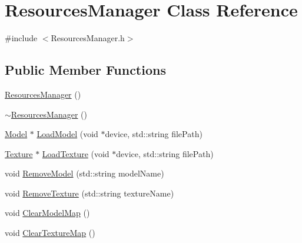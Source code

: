 \hypertarget{class_resources_manager}{\section{Resources\-Manager Class Reference}
\label{class_resources_manager}
}


{\ttfamily \#include $<$Resources\-Manager.\-h$>$}

\subsection*{Public Member Functions}
\begin{DoxyCompactItemize}
\item 
\hyperlink{class_resources_manager_a7fe5ff24c1df6a60214bea3ca474d155}{Resources\-Manager} ()
\item 
\hyperlink{class_resources_manager_aa345cbcc786096e2bb918f2f1139d567}{$\sim$\-Resources\-Manager} ()
\item 
\hyperlink{class_model}{Model} $\ast$ \hyperlink{class_resources_manager_a66fc2968d1be10a45d725faacc931ce1}{Load\-Model} (void $\ast$device, std\-::string file\-Path)
\item 
\hyperlink{class_texture}{Texture} $\ast$ \hyperlink{class_resources_manager_a9be3c24cbfb024a07a91dbd50d9da602}{Load\-Texture} (void $\ast$device, std\-::string file\-Path)
\item 
void \hyperlink{class_resources_manager_a1f33fb87d2bebf862e7e7192c0a4fa48}{Remove\-Model} (std\-::string model\-Name)
\item 
void \hyperlink{class_resources_manager_ae351e7f5d9784754dea19acb40f97eed}{Remove\-Texture} (std\-::string texture\-Name)
\item 
void \hyperlink{class_resources_manager_a18cd7c53246759bb6f11d7fd9df47eaa}{Clear\-Model\-Map} ()
\item 
void \hyperlink{class_resources_manager_a4481302d87dfbb5caea6e502e4c7e39a}{Clear\-Texture\-Map} ()
\end{DoxyCompactItemize}


